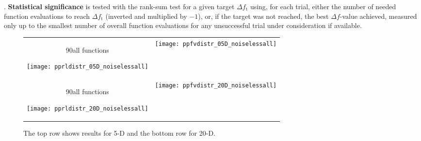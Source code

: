\documentclass{article}
\newcommand{\Df}{\ensuremath{\Delta f}}
\newcommand{\ftarget}{\ensuremath{f_\mathrm{t}}}
\newcommand{\rot}[2][2.5]{
  \hspace*{-3.5\baselineskip}%
  \begin{rotate}{90}\hspace{#1em}#2
  \end{rotate}}
\begin{document}
\cite{hansen2010exp,price1997dev}.
\textbf{Statistical significance} is tested with the rank-sum test for a given
target $\Delta\ftarget$ using, for each trial, either the number of needed
function evaluations to reach $\Delta\ftarget$ (inverted and multiplied by
$-1$), or, if the target was not reached, the best $\Df$-value achieved,
measured only up to the smallest number of overall function evaluations for any
unsuccessful trial under consideration if available.
\begin{figure}[htbp!]
\centering
\begin{tabular}{@{}c@{}c@{}}
\rot[5]{all functions}\texttt{[image: pprldistr\_05D\_noiselessall]} &
\texttt{[image: ppfvdistr\_05D\_noiselessall]}\\
\rot[5]{all functions}\texttt{[image: pprldistr\_20D\_noiselessall]} &
\texttt{[image: ppfvdistr\_20D\_noiselessall]}
\end{tabular}
\caption{\label{fig:RLDs05Da\algfolder} \bbobpprldistrlegend{} The top row shows results for 5-D and the bottom row for 20-D.}
\end{figure}
\end{document}
